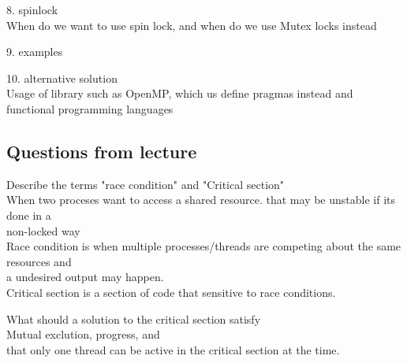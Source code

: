 \documentclass[a4paper,10pt,titlepage]{report}
\begin{document}
\vspace{5mm}
8. spinlock\\
\hspace{10mm}  When do we want to use spin lock, and when do we use Mutex locks instead \\
\vspace{5mm}



9. examples\
\vspace{5mm}


10. alternative solution\\
\hspace{10mm} Usage of library such as OpenMP, which us define pragmas instead and functional
programming languages

\newpage
\subsection{Questions from lecture}

Describe the terms "race condition" and "Critical section"\\

\hspace{10mm} When two proceses want to access a shared resource. that may be unstable if its done in a \\ \hspace{10mm} non-locked way\\
\hspace{10mm} Race condition is when multiple processes/threads are competing about the same resources and \\ \hspace{10mm}  a undesired output may happen. \\
\hspace{10mm}  Critical section is a section of code that sensitive to race conditions.\\
\vspace{5mm}





What should a solution to the critical section satisfy \\
\hspace{10mm}  Mutual exclution, progress, and \\
\hspace{10mm}  that only one thread can be active in the critical section at the time. \\
\vspace{5mm}
\end{document}
